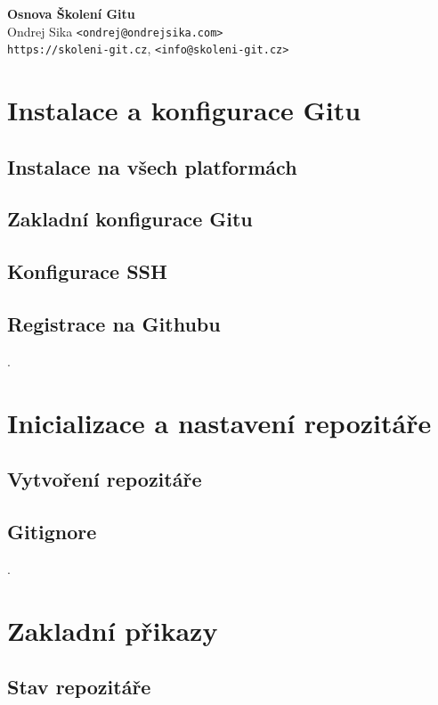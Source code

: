 \documentclass[11pt]{article}
\begin{document}
\begin{center}
{\Huge \bf Osnova Školení Gitu}\\
\vspace*{0.3cm}
{\Large
    Ondrej Sika  \texttt{<ondrej@ondrejsika.com>}\\
    \texttt{https://skoleni-git.cz}, \texttt{<info@skoleni-git.cz>}\\
}
\vspace*{0.6cm}
\end{center}

\section{Instalace a konfigurace Gitu}
\subsection{Instalace na všech platformách}
\subsection{Zakladní konfigurace Gitu}
\subsection{Konfigurace SSH}
\subsection{Registrace na Githubu}

.

\section{Inicializace a nastavení repozitáře}
\subsection{Vytvoření repozitáře}
\subsection{Gitignore}

.

\section{Zakladní přikazy}
\subsection{Stav repozitáře}
\end{document}
